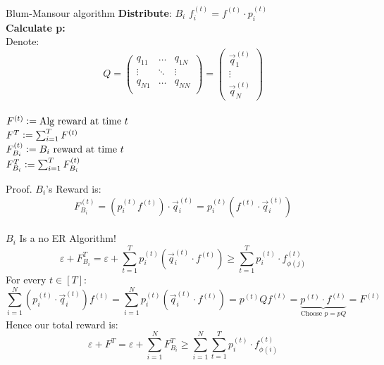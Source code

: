 \documentclass[aspectratio=169,xcolor=dvipsnames,t]{beamer}
\begin{document}
\begin{frame}{Blum-Mansour algorithm}
    \textbf{Distribute}: $B_i$ \leftarrow $f^{(t)}_i=f^{(t)}\cdot p^{(t)}_i$\\
    \pause \textbf{Calculate p:} \\
    \pause Denote:
    \begin{equation*}
        Q = \begin{pmatrix}
            q_{11} & \dots & q_{1N} \\
            \vdots & \ddots & \vdots \\
            q_{N1} & \dots & q_{NN} \\
        \end{pmatrix} = 
        \begin{pmatrix}
            \vec{q}_{1}^{(t)} \\
            \vdots \\ 
            \vec{q}_{N}^{(t)} 
        \end{pmatrix}
    \end{equation*}\\
    \pause $F^{(t)} \vcentcolon= \text{Alg reward at time $t$}$\\
    \pause $F^T \vcentcolon = \sum_{i=1}^T F^{(t)}$\\
    \pause $F_{B_i}^{(t)} \vcentcolon = \text{$B_i$ reward at time $t$}$\\
    \pause $F_{B_i}^T \vcentcolon = \sum_{i=1}^T F_{B_i}^{(t)}$\\
\end{frame}

\begin{frame}[label=last]{Proof.}
    $B_i$'s Reward is: $$F_{B_i}^{(t)} = (p_i^{(t)} f^{(t)})\cdot\vec{q}_i^{(t)} = p_i^{(t)} (f^{(t)}\cdot \vec{q}_i^{(t)})$$
    \pause \\ $B_i$ Is a no ER Algorithm!
    \pause $$ \varepsilon + F^T_{B_i} = \varepsilon + \sum_{t=1}^T p_i^{(t)}(\vec{q}_i^{(t)} \cdot f^{(t)})  \geq \sum_{t=1}^T p_i^{(t)} \cdot f^{(t)}_{\phi(j)}$$
    \pause For every $t \in [T]$:
    $$
        \sum_{i=1}^N (p_i^{(t)} \cdot\vec{q}_i^{(t)})f^{(t)}= \sum_{i=1}^N p_i^{(t)}(\vec{q}_i^{(t)}\cdot f^{(t)}) = p^{(t)} Q f^{(t)} =
            \underset{\text{Choose $p=pQ$}}{\underbrace{ p^{(t)} \cdot f^{(t)}}} = F^{(t)}
    $$
    \pause Hence our total reward is:
    $$
        \varepsilon + F^{T} = \varepsilon + \sum_{i=1}^N F_{B_i}^{T} \geq \sum_{i=1}^N \sum_{t=1}^T p_i^{(t)} \cdot f^{(t)}_{\phi(i)}
    $$
\end{frame}
\end{document}
